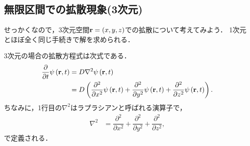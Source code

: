 \subsection{無限区間での拡散現象(3次元)}
%
せっかくなので，3次元空間${\bf r}=(x,y,z)$での拡散について考えてみよう．
1次元とほぼ全く同じ手続きで解を求められる．

3次元の場合の拡散方程式は次式である．
%
\begin{align}
 \dfrac{\partial}{\partial t}\psi\left({\bf r},t\right) & =D\nabla^{2}\psi\left({\bf r},t\right)\notag\\
 & =D\left(\dfrac{\partial^{2}}{\partial x^{2}}\psi\left({\bf r},t\right)+\dfrac{\partial^{2}}{\partial y^{2}}\psi\left({\bf r},t\right)+\dfrac{\partial^{2}}{\partial z^{2}}\psi\left({\bf r},t\right)\right).
\end{align}
%
ちなみに，1行目の$\nabla^{2}$はラプラシアンと呼ばれる演算子で，
\begin{align}
\nabla^{2} & =\dfrac{\partial^{2}}{\partial x^{2}}+\dfrac{\partial^{2}}{\partial y^{2}}+\dfrac{\partial^{2}}{\partial z^{2}},
\end{align}
で定義される．
%

